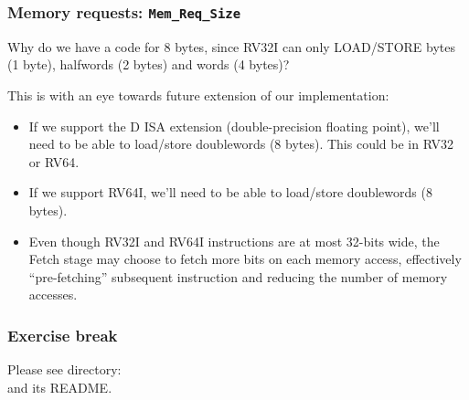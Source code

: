 \begin{frame}[fragile]
\frametitle{Memory requests: {\tt Mem\_Req\_Size}}

\footnotesize


\PAUSE{\vspace{2ex}}

Why do we have a code for 8 bytes, since RV32I can only LOAD/STORE
bytes (1 byte), halfwords (2 bytes) and words (4 bytes)?

\PAUSE{\vspace{2ex}}

This is with an eye towards future extension of our implementation:

\begin{itemize}

 \item If we support the D ISA extension (double-precision floating
       point), we'll need to be able to load/store doublewords (8 bytes).
       This could be in RV32 or RV64.

 \item If we support RV64I, we'll need to be able to load/store
       doublewords (8 bytes).

 \PAUSE{\vspace{2ex}}

 \item Even though RV32I and RV64I instructions are at most 32-bits
       wide, the Fetch stage may choose to fetch more bits on each
       memory access, effectively ``pre-fetching'' subsequent
       instruction and reducing the number of memory accesses.

\end{itemize}

\end{frame}


\begin{frame}
\frametitle{\EmojiExercise \hmm Exercise break}

Please see directory:  \\
and its README.

\end{frame}


